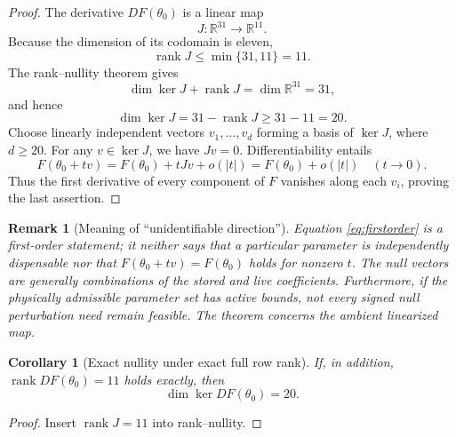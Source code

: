 \documentclass[11pt]{article}
\newtheorem{corollary}[theorem]{Corollary}
\newtheorem{remark}[theorem]{Remark}
\newcommand{\R}{\mathbb{R}}
\newcommand{\rank}{\operatorname{rank}}
\newcommand{\Null}{\operatorname{ker}}
\begin{document}
\begin{proof}
The derivative \(DF(\theta_0)\) is a linear map
\begin{equation}
 J:\R^{31}\longrightarrow\R^{11}.
\end{equation}
Because the dimension of its codomain is eleven,
\begin{equation}
 \rank J\leq\min\{31,11\}=11.
\end{equation}
The rank--nullity theorem gives
\begin{equation}
  \dim\Null J+\rank J=\dim\R^{31}=31,
\end{equation}
and hence
\begin{equation}
  \dim\Null J=31-\rank J\geq31-11=20.
\end{equation}
Choose linearly independent vectors
\(v_1,\ldots,v_d\) forming a basis of \(\Null J\), where \(d\geq20\).
For any \(v\in\Null J\), we have \(Jv=0\). Differentiability entails
\begin{equation}
 F(\theta_0+tv)
   =F(\theta_0)+tJv+o(|t|)
   =F(\theta_0)+o(|t|)
 \quad (t\to0).
 \label{eq:firstorder}
\end{equation}
Thus the first derivative of every component of \(F\) vanishes along
each \(v_i\), proving the last assertion.
\end{proof}

\begin{remark}[Meaning of ``unidentifiable direction'']
Equation \eqref{eq:firstorder} is a \emph{first-order} statement; it
neither says that a particular parameter is independently dispensable nor
that \(F(\theta_0+tv)=F(\theta_0)\) holds for nonzero \(t\).
The null vectors are generally combinations of the stored and live
coefficients. Furthermore, if the physically admissible parameter set
has active bounds, not every signed null perturbation need remain
feasible. The theorem concerns the ambient linearized map.
\end{remark}

\begin{corollary}[Exact nullity under exact full row rank]
\label{cor:exact}
If, in addition, \(\rank DF(\theta_0)=11\) holds \emph{exactly}, then
\begin{equation}
  \boxed{\dim\Null DF(\theta_0)=20}.
\end{equation}
\end{corollary}
\begin{proof}
Insert \(\rank J=11\) into rank--nullity.
\end{proof}
\end{document}
